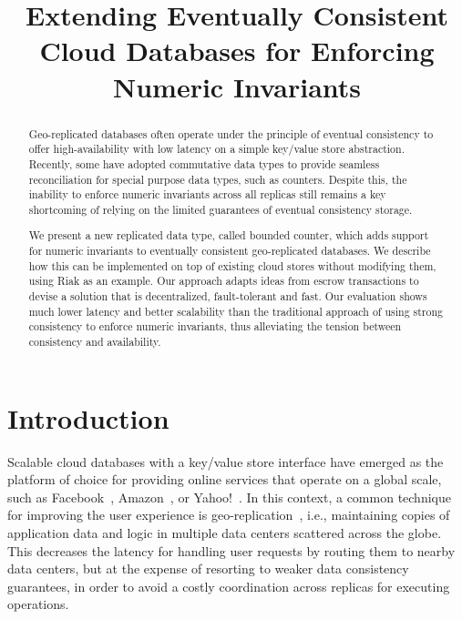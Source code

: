 \documentclass[conference]{IEEEtran}
\begin{document}
\author{
\and
{}
}


\title{Extending Eventually Consistent Cloud Databases for Enforcing Numeric Invariants}
\maketitle

\begin{abstract}


Geo-replicated databases often operate under the
principle of eventual consistency to offer high-availability with low latency
on a simple key/value store abstraction. Recently, some have adopted 
commutative data types to provide seamless reconciliation for special purpose data types, such as counters. 
Despite this, the inability to enforce numeric invariants across all replicas
still remains a key shortcoming of relying on the limited guarantees of eventual consistency storage. 

We present a new replicated data type, called bounded counter,
which adds support for numeric invariants to eventually consistent geo-replicated databases.
We describe how this can be implemented on top of existing cloud stores without modifying them,
using Riak as an example. Our approach adapts ideas from escrow transactions to
devise a solution that is decentralized, fault-tolerant and fast. Our evaluation shows much lower 
latency and better scalability than the traditional approach of
using strong consistency to enforce numeric invariants, thus
alleviating the tension between consistency and availability.

\end{abstract}











\section{Introduction}	\label{sec:introduction}

Scalable cloud databases with a key/value store interface 
have emerged as the platform of choice for providing online services that operate on a global scale,
such as Facebook~\cite{cassandra}, Amazon~\cite{dynamo}, or Yahoo!~\cite{pnuts}.
In this context, a common technique for improving the user experience is geo-replication~\cite{dynamo,pnuts,walter}, i.e., maintaining copies of application data and logic in multiple data centers scattered across the globe. This decreases the latency for handling user requests by routing them
to nearby data centers, but at the expense of resorting to weaker data consistency guarantees, in order to avoid a costly coordination across replicas
for executing operations.
\end{document}

